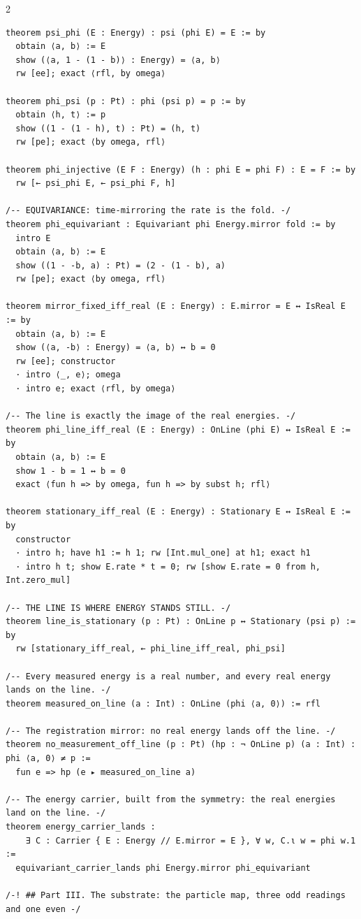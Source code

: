 \documentclass[10pt]{article}
\begin{document}
\begin{multicols}{2}
\begin{Verbatim}[fontsize=\fontsize{6.0}{6.9}\selectfont,breaklines,breakanywhere,breaksymbolleft={}]
theorem psi_phi (E : Energy) : psi (phi E) = E := by
  obtain ⟨a, b⟩ := E
  show (⟨a, 1 - (1 - b)⟩ : Energy) = ⟨a, b⟩
  rw [ee]; exact ⟨rfl, by omega⟩

theorem phi_psi (p : Pt) : phi (psi p) = p := by
  obtain ⟨h, t⟩ := p
  show ((1 - (1 - h), t) : Pt) = (h, t)
  rw [pe]; exact ⟨by omega, rfl⟩

theorem phi_injective (E F : Energy) (h : phi E = phi F) : E = F := by
  rw [← psi_phi E, ← psi_phi F, h]

/-- EQUIVARIANCE: time-mirroring the rate is the fold. -/
theorem phi_equivariant : Equivariant phi Energy.mirror fold := by
  intro E
  obtain ⟨a, b⟩ := E
  show ((1 - -b, a) : Pt) = (2 - (1 - b), a)
  rw [pe]; exact ⟨by omega, rfl⟩

theorem mirror_fixed_iff_real (E : Energy) : E.mirror = E ↔ IsReal E := by
  obtain ⟨a, b⟩ := E
  show (⟨a, -b⟩ : Energy) = ⟨a, b⟩ ↔ b = 0
  rw [ee]; constructor
  · intro ⟨_, e⟩; omega
  · intro e; exact ⟨rfl, by omega⟩

/-- The line is exactly the image of the real energies. -/
theorem phi_line_iff_real (E : Energy) : OnLine (phi E) ↔ IsReal E := by
  obtain ⟨a, b⟩ := E
  show 1 - b = 1 ↔ b = 0
  exact ⟨fun h => by omega, fun h => by subst h; rfl⟩

theorem stationary_iff_real (E : Energy) : Stationary E ↔ IsReal E := by
  constructor
  · intro h; have h1 := h 1; rw [Int.mul_one] at h1; exact h1
  · intro h t; show E.rate * t = 0; rw [show E.rate = 0 from h, Int.zero_mul]

/-- THE LINE IS WHERE ENERGY STANDS STILL. -/
theorem line_is_stationary (p : Pt) : OnLine p ↔ Stationary (psi p) := by
  rw [stationary_iff_real, ← phi_line_iff_real, phi_psi]

/-- Every measured energy is a real number, and every real energy lands on the line. -/
theorem measured_on_line (a : Int) : OnLine (phi ⟨a, 0⟩) := rfl

/-- The registration mirror: no real energy lands off the line. -/
theorem no_measurement_off_line (p : Pt) (hp : ¬ OnLine p) (a : Int) : phi ⟨a, 0⟩ ≠ p :=
  fun e => hp (e ▸ measured_on_line a)

/-- The energy carrier, built from the symmetry: the real energies land on the line. -/
theorem energy_carrier_lands :
    ∃ C : Carrier { E : Energy // E.mirror = E }, ∀ w, C.ι w = phi w.1 :=
  equivariant_carrier_lands phi Energy.mirror phi_equivariant

/-! ## Part III. The substrate: the particle map, three odd readings and one even -/


\end{Verbatim}
\end{multicols}
\end{document}
